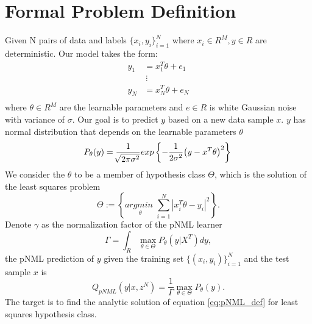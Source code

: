 \documentclass[conference,letterpaper]{IEEEtran}
\begin{document}
\section{Formal Problem Definition} \label{sec:formal_problem_def}
Given N pairs of data and labels $\{x_i, y_i\}_{i=1}^{N}$ where $x_i \in R^M, y\in R$ are deterministic. Our model takes the form:
\begin{equation}
\begin{split}
y_1&=x_1^T \theta + e_1 \\
   &\ \vdots \\
y_{N}&=x_{N}^T \theta + e_{N} \\
\end{split}
\end{equation}
where $\theta \in R^M$ are the learnable parameters and $e \in R$ is white Gaussian noise with variance of $\sigma$. 
Our goal is to predict $y$ based on a new data sample $x$. 
$y$ has normal distribution that depends on the learnable parameters $\theta$ 
\begin{equation}
P_{\theta}(y) 
=\frac{1}{\sqrt[]{2\pi\sigma^2}}exp\left\{-\frac{1}{2\sigma^2}\big(y- x^T\theta \big)^2\right\}  \\
\end{equation}
We consider the $\theta$ to be a member of hypothesis class $\Theta$, which is the solution of the least squares problem
\begin{equation} \label{eq:ls_hypotheses_class}
\Theta := \left\{ \underset{\theta}{\textit{argmin }} \sum_{i=1}^{N} | x^T_i \theta - y_i |^2 \right\}.
\end{equation}
Denote $\gamma$ as the normalization factor of the pNML learner
\begin{equation}
\Gamma=\int_R \max_{\theta \in \Theta} P_\theta(y|X^T)dy,   
\end{equation}
the pNML prediction of $y$ given the training set $\{(x_i,y_i)\}_{i=1}^{N}$ and the test sample $x$ is
\begin{equation} \label{eq:pNML_def}
Q_{\textit{pNML}}(y|x,z^N) = \frac{1}{\Gamma} \max_{\theta \in \Theta} P_\theta(y).
\end{equation}
The target is to find the analytic solution of equation \ref{eq:pNML_def} for least squares hypothesis class.
\end{document}
